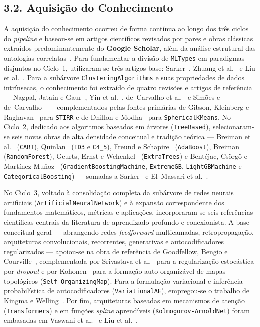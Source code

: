 \documentclass[11pt,a4paper]{article}
\newcommand{\onto}[1]{\texttt{\small #1}}
\begin{document}
\subsection{3.2. Aquisição do Conhecimento}

A aquisição do conhecimento ocorreu de forma contínua ao longo dos três ciclos do \emph{pipeline} e baseou-se em artigos científicos revisados por pares e obras clássicas extraídos predominantemente do \textbf{Google Scholar}, além da análise estrutural das ontologias correlatas~\cite{publio2018mlschema,braga2020mlonto,elmassari2022diabetes,humm2026industry}. Para fundamentar a divisão de \onto{MLTypes} em paradigmas disjuntos no Ciclo~1, utilizaram-se três artigos-base: Sarker~\cite{sarker2021ml}, Zhuang et al.~\cite{zhuang2021transfer} e Liu et al.~\cite{liu2023self}. Para a subárvore \onto{ClusteringAlgorithms} e suas propriedades de dados intrínsecas, o conhecimento foi extraído de quatro revisões e artigos de referência --- Nagpal, Jatain e Gaur~\cite{nagpal2013review}, Yin et al.~\cite{yin2026rapid}, de~Carvalho et al.~\cite{decarvalho2018gaussian} e Simões e de~Carvalho~\cite{simoes2023gaussian} --- complementados pelas fontes primárias de Gibson, Kleinberg e Raghavan~\cite{gibson1998clustering} para \onto{STIRR} e de Dhillon e Modha~\cite{dhillon2001concept} para \onto{SphericalKMeans}. No Ciclo~2, dedicado aos algoritmos baseados em árvores (\onto{TreeBased}), selecionaram-se seis novas obras de alta densidade conceitual e tradição teórica --- Breiman et al.~\cite{breiman1984cart} (\onto{CART}), Quinlan~\cite{quinlan1993c45} (\onto{ID3} e \onto{C4\_5}), Freund e Schapire~\cite{freund1997decision} (\onto{AdaBoost}), Breiman~\cite{breiman2001random} (\onto{RandomForest}), Geurts, Ernst e Wehenkel~\cite{geurts2006extremely} (\onto{ExtraTrees}) e Bentéjac, Csörgő e Martínez-Muñoz~\cite{bentejac2021comparative} (\onto{GradientBoostingMachine}, \onto{ExtremeGB}, \onto{LightGBMachine} e \onto{CategoricalBoosting}) --- somadas a Sarker~\cite{sarker2021ml} e El~Massari et al.~\cite{elmassari2022diabetes}.

No Ciclo~3, voltado à consolidação completa da subárvore de redes neurais artificiais (\onto{ArtificialNeuralNetwork}) e à expansão correspondente dos fundamentos matemáticos, métricas e aplicações, incorporaram-se seis referências científicas centrais da literatura de aprendizado profundo e conexionista. A base conceitual geral --- abrangendo redes \emph{feedforward} multicamadas, retropropagação, arquiteturas convolucionais, recorrentes, generativas e autocodificadores regularizados --- apoiou-se na obra de referência de Goodfellow, Bengio e Courville~\cite{goodfellow2016deep}, complementada por Srivastava et al.~\cite{srivastava2014dropout} para a regularização estocástica por \emph{dropout} e por Kohonen~\cite{kohonen1982self} para a formação auto-organizável de mapas topológicos (\onto{Self-OrganizingMap}). Para a formulação variacional e inferência probabilística de autocodificadores (\onto{VariationalAE}), empregou-se o trabalho de Kingma e Welling~\cite{kingma2014vae}. Por fim, arquiteturas baseadas em mecanismos de atenção (\onto{Transformers}) e em funções \emph{spline} aprendíveis (\onto{Kolmogorov-ArnoldNet}) foram embasadas em Vaswani et al.~\cite{vaswani2017attention} e Liu et al.~\cite{liu2024kan}.
\end{document}
